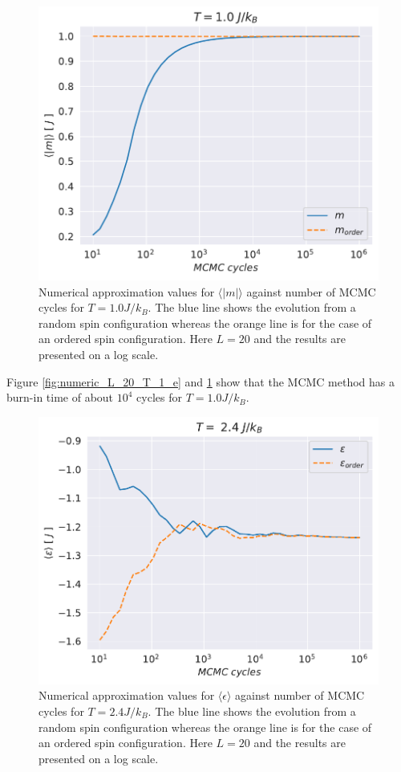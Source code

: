\documentclass[english,notitlepage,reprint,nofootinbib]{revtex4-1}  %
\begin{document}
\begin{figure}[H]
    \centering
    \includegraphics[width=.5\textwidth]{../figures/numeric_L_20_T_1_m.pdf}
    \caption{Numerical approximation values for $\langle |m| \rangle$ against number of MCMC cycles for $T=1.0 J/k_B$. The blue line shows the evolution from a random spin configuration whereas the orange line is for the case of an ordered spin configuration. Here $L=20$ and the results are presented on a log scale.}
    \label{fig:numeric_L_20_T_1_m}
\end{figure}
Figure \ref{fig:numeric_L_20_T_1_e} and \ref{fig:numeric_L_20_T_1_m} show that the MCMC method has a burn-in time of about $10^4$ cycles for $T=1.0J/k_B$.

\begin{figure}[H]
    \centering
    \includegraphics[width=.5\textwidth]{../figures/numeric_L_20_T_2_4_e.pdf}
    \caption{Numerical approximation values for $\langle \epsilon \rangle$ against number of MCMC cycles for $T=2.4 J/k_B$. The blue line shows the evolution from a random spin configuration whereas the orange line is for the case of an ordered spin configuration. Here $L=20$ and the results are presented on a log scale.}
    \label{fig:numeric_L_20_T_2_4_e}
\end{figure}
\end{document}
